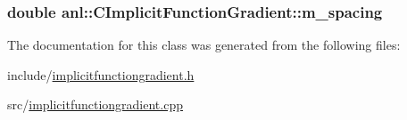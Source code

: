 \label{classanl_1_1CImplicitFunctionGradient_a13b46a71cb6454ac806b82a104acf7b2}
\hypertarget{classanl_1_1CImplicitFunctionGradient_a527780ba24450fedce559f2e791ed647}{
\subsubsection[{m\_\-spacing}]{\setlength{\rightskip}{0pt plus 5cm}double {\bf anl::CImplicitFunctionGradient::m\_\-spacing}}}
\label{classanl_1_1CImplicitFunctionGradient_a527780ba24450fedce559f2e791ed647}


The documentation for this class was generated from the following files:\begin{DoxyCompactItemize}
\item 
include/\hyperlink{implicitfunctiongradient_8h}{implicitfunctiongradient.h}\item 
src/\hyperlink{implicitfunctiongradient_8cpp}{implicitfunctiongradient.cpp}\end{DoxyCompactItemize}
